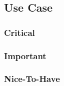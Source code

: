 \subsection{Use Case}
\subsubsection{Critical}
\subsubsection{Important}
\subsubsection{Nice-To-Have}
